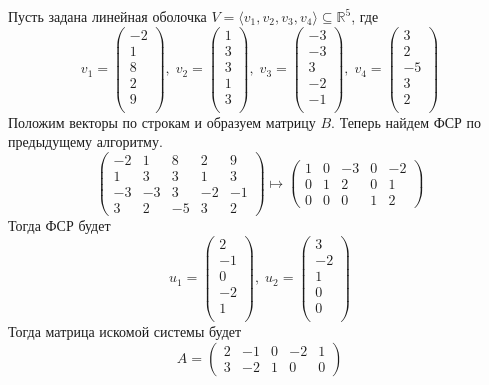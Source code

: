 \documentclass{article}
\begin{document}
Пусть задана линейная оболочка $V = \langle v_1, v_2, v_3, v_4\rangle \subseteq \mathbb R^5$, где
\[
v_{{1}} = \begin{pmatrix}
{-2}\\
{1}\\
{8}\\
{2}\\
{9}\\
\end{pmatrix},\;v_{{2}} = \begin{pmatrix}
{1}\\
{3}\\
{3}\\
{1}\\
{3}\\
\end{pmatrix},\;v_{{3}} = \begin{pmatrix}
{-3}\\
{-3}\\
{3}\\
{-2}\\
{-1}\\
\end{pmatrix},\;v_{{4}} = \begin{pmatrix}
{3}\\
{2}\\
{-5}\\
{3}\\
{2}\\
\end{pmatrix}
\]
Положим векторы по строкам и образуем матрицу $B$.
Теперь найдем ФСР по предыдущему алгоритму.
\[
\begin{pmatrix}
-2&1&8&2&9\\
1&3&3&1&3\\
-3&-3&3&-2&-1\\
3&2&-5&3&2
\end{pmatrix}
\mapsto
\begin{pmatrix}
1&0&-3&0&-2\\
0&1&2&0&1\\
0&0&0&1&2
\end{pmatrix}
\]
Тогда ФСР будет
\[
u_{{1}} = \begin{pmatrix}
{2}\\
{-1}\\
{0}\\
{-2}\\
{1}\\
\end{pmatrix},\;u_{{2}} = \begin{pmatrix}
{3}\\
{-2}\\
{1}\\
{0}\\
{0}\\
\end{pmatrix}
\]
Тогда матрица искомой системы будет
\[
A =
\begin{pmatrix}
2&-1&0&-2&1\\
3&-2&1&0&0
\end{pmatrix}
\]
\end{document}
